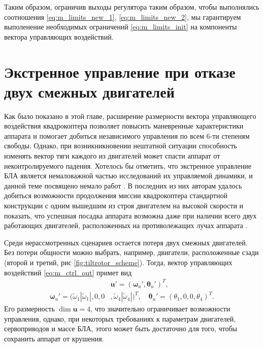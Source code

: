 Таким образом, ограничив выходы регулятора таким образом, чтобы выполнялись соотношения \eqref{eq:m_limits_new_1}, \eqref{eq:m_limits_new_2}, мы гарантируем выполенение необходимых ограничений \eqref{eq:m_limits_init} на компоненты вектора управляющих воздействий.

\section{Экстренное управление при отказе двух смежных двигателей}
\label{section_em_ctrl}

Как было показано в этой главе, расширение размерности вектора управляющего воздействия квадрокоптера позволяет повысить маневренные характеристики аппарата и помогает добиться независимого управления по всем 6-ти степеням свободы.
Однако, при возникникновении нештатной ситуации способность изменять вектор тяги каждого из двигателей может спасти аппарат от неконтролируемого падения.
Хотелось бы отметить, что экстренное управление БЛА является немаловажной частью исследований их управляемой динамики, и данной теме посвящено немало работ \cite{Morozov01, Lippiello01, Mueller01}. В последних из них авторам удалось добиться возможности продолжения миссии квадрокоптера стандартной конструкции с одним вышедшим из строя двигателем на высокой скорости \cite{Sun01} и показать, что успешная посадка аппарата возможна даже при наличии всего двух работающих двигателей, расположенных на противолежащих лучах аппарата \cite{Sun01}.

Среди нерассмотренных сценариев остается потеря двух смежных двигателей.
Без потери общности можно выбрать, например, двигатели, расположенные сзади (второй и третий, рис \ref{fig:tiltrotor_scheme}). Тогда, вектор управляющих воздействий \eqref{eq:m_ctrl_out} примет вид
\begin{equation} \label{eq:em_ctrl_out}
\begin{aligned}
&\bm{u'} = (\bm \omega_u', \bm \theta_u')^T,
\\
\bm \omega_u' =
(\tilde\omega_1 |\tilde\omega_1|,
0,
0&,
\tilde\omega_4 |\tilde\omega_4|)^T,
\quad
\bm \theta_u' = (\theta_1, 0, 0, \theta_4 )^T.
\end{aligned}
\end{equation}
Его размерность $\dim \bm{u}=4$, что значительно ограничивает возможности управления, однако, при некоторых требованиях к параметрам двигателей, сервоприводов и массе БЛА, этого может быть достаточно для того, чтобы сохранить аппарат от крушения. 

